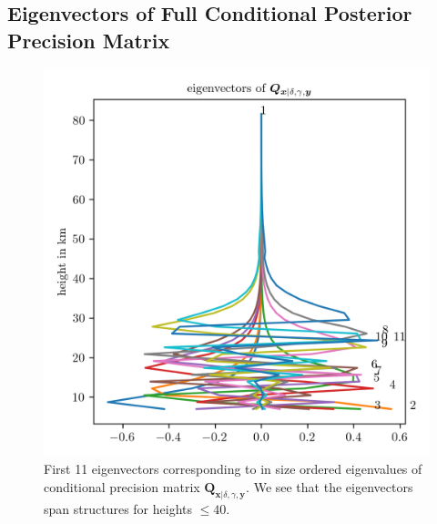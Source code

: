 \subsection{Eigenvectors of Full Conditional Posterior Precision Matrix}
 \begin{figure}[ht!]
 	\centering
 	\includegraphics{CovEigVec1.png}
 	\caption[First 11 eigenvectors of conditional precision matrix.]{First 11 eigenvectors corresponding to in size ordered eigenvalues of conditional precision matrix $\bm{Q}_{ \bm{x}|\delta, \gamma, \bm{y}}$.
 	We see that the eigenvectors span structures for heights $\leq 40$.}
 	\label{fig:CovEigVec1}
 \end{figure}
